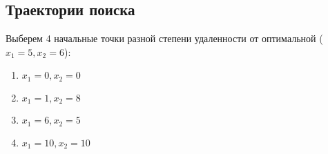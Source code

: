 

\subsection{Траектории поиска}

Выберем 4 начальные точки разной степени удаленности от оптимальной ($x_1 = 5, x_2 = 6$): 
\begin{multicols}{2} 
\begin{enumerate}
	\setlength{\itemsep}{0em}
	\item $x_1 = 0, x_2 = 0$
	\item $x_1 = 1, x_2 = 8$
	\item $x_1 = 6, x_2 = 5$
	\item $x_1 = 10, x_2 = 10$
\end{enumerate}
\end{multicols}

\vspace{-0.5cm}

